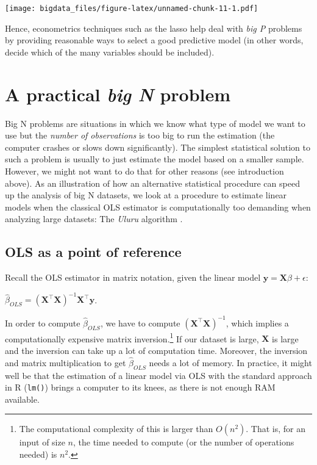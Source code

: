 \documentclass[
  12pt,
]{style/krantz}
\begin{document}
\texttt{[image: bigdata\_files/figure-latex/unnamed-chunk-11-1.pdf]}

Hence, econometrics techniques such as the lasso help deal with \emph{big P} problems by providing reasonable ways to select a good predictive model (in other words, decide which of the many variables should be included).

\hypertarget{a-practical-big-n-problem}{%
\section{\texorpdfstring{A practical \emph{big N} problem}{A practical big N problem}}\label{a-practical-big-n-problem}}

Big N problems are situations in which we know what type of model we want to use but the \emph{number of observations} is too big to run the estimation (the computer crashes or slows down significantly). The simplest statistical solution to such a problem is usually to just estimate the model based on a smaller sample. However, we might not want to do that for other reasons (see introduction above). As an illustration of how an alternative statistical procedure can speed up the analysis of big N datasets, we look at a procedure to estimate linear models when the classical OLS estimator is computationally too demanding when analyzing large datasets: The \emph{Uluru} algorithm \citep{dhillon_2013}.

\hypertarget{ols-as-a-point-of-reference}{%
\subsection{OLS as a point of reference}\label{ols-as-a-point-of-reference}}

Recall the OLS estimator in matrix notation, given the linear model \(\mathbf{y}=\mathbf{X}\beta + \epsilon\):

\(\hat{\beta}_{OLS} = (\mathbf{X}^\intercal\mathbf{X})^{-1}\mathbf{X}^{\intercal}\mathbf{y}\).

In order to compute \(\hat{\beta}_{OLS}\), we have to compute \((\mathbf{X}^\intercal\mathbf{X})^{-1}\), which implies a computationally expensive matrix inversion.\footnote{The computational complexity of this is larger than \(O(n^{2})\). That is, for an input of size \(n\), the time needed to compute (or the number of operations needed) is \(n^2\).} If our dataset is large, \(\mathbf{X}\) is large and the inversion can take up a lot of computation time. Moreover, the inversion and matrix multiplication to get \(\hat{\beta}_{OLS}\) needs a lot of memory. In practice, it might well be that the estimation of a linear model via OLS with the standard approach in R (\texttt{lm()}) brings a computer to its knees, as there is not enough RAM available.
\end{document}
